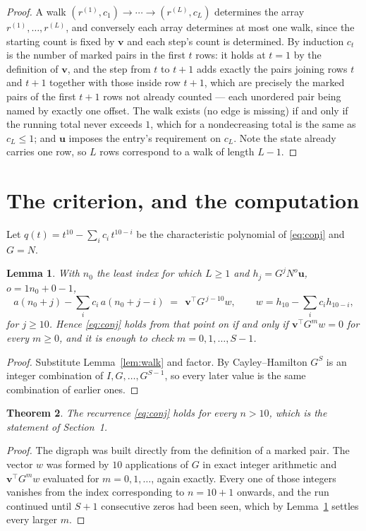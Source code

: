\documentclass[11pt,a4paper]{article}
\theoremstyle{plain}
\newtheorem{theorem}{Theorem}
\newtheorem{lemma}[theorem]{Lemma}
\theoremstyle{definition}
\begin{document}
\begin{proof}
A walk $(r^{(1)},c_1)\to\cdots\to(r^{(L)},c_L)$ determines the array
$r^{(1)},\dots,r^{(L)}$, and conversely each array determines at most one walk, since the
starting count is fixed by $\mathbf{v}$ and each step's count is determined. By induction
$c_t$ is the number of marked pairs in the first $t$ rows: it holds at $t=1$ by the
definition of $\mathbf{v}$, and the step from $t$ to $t+1$ adds exactly the pairs joining
rows $t$ and $t+1$ together with those inside row $t+1$, which are precisely the marked
pairs of the first $t+1$ rows not already counted --- each unordered pair being named by
exactly one offset. The walk exists (no edge is missing) if and only if the running total
never exceeds $1$, which for a nondecreasing total is the same as $c_L\le1$; and
$\mathbf{u}$ imposes the entry's requirement on $c_L$. Note the state already carries one
row, so $L$ rows correspond to a walk of length $L-1$.
\end{proof}

\section{The criterion, and the computation}

Let $q(t)=t^{10}-\sum_i c_i\,t^{10-i}$ be the characteristic polynomial of
\eqref{eq:conj} and $G=N$.

\begin{lemma}\label{lem:crit}
With $n_0$ the least index for which $L\ge1$ and $h_j=G^{j}N^{o}\mathbf{u}$,
$o=1n_0+0-1$,
\[
a(n_0+j)-\sum_i c_i\,a(n_0+j-i)\;=\;\,\mathbf{v}^{\!\top}G^{\,j-10}w,
\qquad w=h_{10}-\sum_i c_i h_{10-i},
\]
for $j\ge10$. Hence \eqref{eq:conj} holds from that point on if and only if
$\mathbf{v}^{\!\top}G^{m}w=0$ for every $m\ge0$, and it is enough to check
$m=0,1,\dots,S-1$.
\end{lemma}

\begin{proof}
Substitute Lemma~\ref{lem:walk} and factor. By Cayley--Hamilton $G^{S}$ is an integer
combination of $I,G,\dots,G^{S-1}$, so every later value is the same combination of earlier
ones.
\end{proof}

\begin{theorem}
The recurrence \eqref{eq:conj} holds for every $n>10$, which is the statement of
Section~1.
\end{theorem}

\begin{proof}
The digraph was built directly from the definition of a marked pair. The vector $w$ was
formed by $10$ applications of $G$ in exact integer arithmetic and
$\mathbf{v}^{\!\top}G^{m}w$ evaluated for $m=0,1,\dots$, again exactly. Every one of
those integers vanishes from the index corresponding to $n=10+1$ onwards, and the run
continued until $S+1$ consecutive zeros had been seen, which by Lemma~\ref{lem:crit}
settles every larger $m$.
\end{proof}
\end{document}
